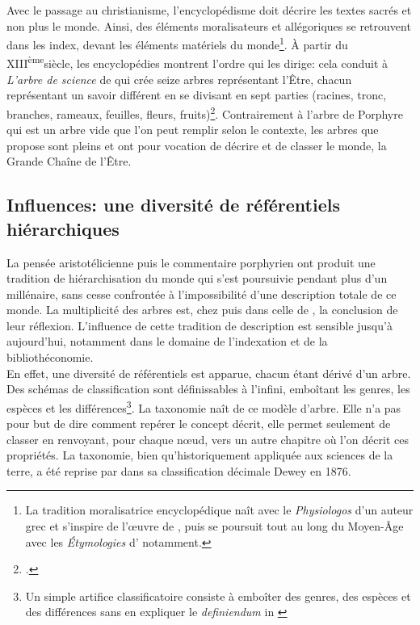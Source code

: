 Avec le passage au christianisme, l'encyclopédisme doit décrire les textes sacrés et non plus le monde. Ainsi, des éléments moralisateurs et allégoriques se retrouvent dans les index, devant les éléments matériels du monde\footnote{La tradition moralisatrice encyclopédique naît avec le \textit{Physiologos} d'un auteur grec et s'inspire de l'œuvre de , puis se poursuit tout au long du Moyen-Âge avec les \textit{Étymologies} d' notamment.}. À partir du \textsc{XIII}\textsuperscript{ème}siècle, les encyclopédies montrent l'ordre qui les dirige: cela conduit à \textit{L'arbre de science} de  qui crée seize arbres représentant l'Être, chacun représentant un savoir différent en se divisant en sept parties (racines, tronc, branches, rameaux, feuilles, fleurs, fruits)\footcite[chap.10]{eco_arbre_2010}. Contrairement à l'arbre de Porphyre qui est un arbre vide que l'on peut remplir selon le contexte, les arbres que propose  sont pleins et ont pour vocation de décrire et de classer le monde, la Grande Chaîne de l'Être.

\subsection{\label{I-C-1-c}Influences: une diversité de référentiels hiérarchiques}

La pensée aristotélicienne puis le commentaire porphyrien ont produit une tradition de hiérarchisation du monde qui s'est poursuivie pendant plus d'un millénaire, sans cesse confrontée à l'impossibilité d'une description totale de ce monde. La multiplicité des arbres est, chez  puis dans celle de , la conclusion de leur réflexion. L'influence de cette tradition de description est sensible jusqu'à aujourd'hui, notamment dans le domaine de l'indexation et de la bibliothéconomie.\\

En effet, une diversité de référentiels est apparue, chacun étant dérivé d'un arbre. Des schémas de classification sont définissables à l'infini, emboîtant les genres, les espèces et les différences\footnote{\og Un simple artifice classificatoire consiste à emboîter des genres, des espèces et des différences sans en expliquer le \textit{definiendum}\fg{} in \cite[chap.1]{eco_arbre_2010}}. La taxonomie naît de ce modèle d'arbre. Elle n'a pas pour but de dire comment repérer le concept décrit, elle permet seulement de classer en renvoyant, pour chaque nœud, vers un autre chapitre où l'on décrit ces propriétés. La taxonomie, bien qu'historiquement appliquée aux sciences de la terre, a été reprise par  dans sa classification décimale Dewey en 1876.\\


